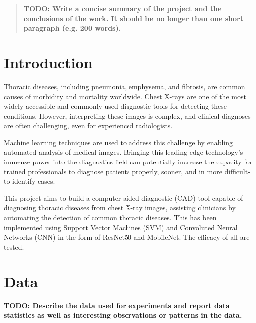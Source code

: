\documentclass{article}
\theoremstyle{plain}
\theoremstyle{definition}
\theoremstyle{remark}
\begin{document}

\begin{abstract}
    \textbf{TODO: Write a concise summary of the project and the conclusions of the work. It should be no longer
    than one short paragraph (e.g. 200 words).}
\end{abstract}

\section{Introduction}
Thoracic diseases, including pneumonia, emphysema, and fibrosis, are common causes of morbidity and
mortality worldwide. Chest X-rays are one of the most widely accessible and commonly used diagnostic
tools for detecting these conditions. However, interpreting these images is complex, and clinical
diagnoses are often challenging, even for experienced radiologists.

Machine learning techniques are used to address this challenge by enabling automated analysis of
medical images. Bringing this leading-edge technology's immense power into the diagnostics field can
potentially increase the capacity for trained professionals to diagnose patients properly, sooner,
and in more difficult-to-identify cases.

This project aims to build a computer-aided diagnostic (CAD) tool capable of diagnosing thoracic
diseases from chest X-ray images, assisting clinicians by automating the detection of common thoracic
diseases. This has been implemented using Support Vector Machines (SVM) and Convoluted Neural Networks
(CNN) in the form of ResNet50 and MobileNet. The efficacy of all are tested.

\section{Data}
\textbf{TODO: Describe the data used for experiments and report data statistics as well as interesting
observations or patterns in the data.}
\end{document}

